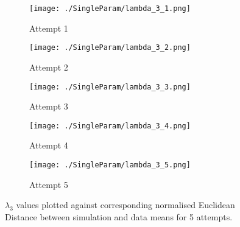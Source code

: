 \begin{figure}
    \begin{subfigure}{.5\textwidth}
      \centering
      \texttt{[image: ./SingleParam/lambda\_3\_1.png]}
      \caption{Attempt 1}
      \label{singlelam:1}
    \end{subfigure}
    \begin{subfigure}{.5\textwidth}
      \centering
      \texttt{[image: ./SingleParam/lambda\_3\_2.png]}
      \caption{Attempt 2}
      \label{singlelam:2}
    \end{subfigure}
    \begin{subfigure}{.5\textwidth}
        \centering
        \texttt{[image: ./SingleParam/lambda\_3\_3.png]}
        \caption{Attempt 3}
        \label{singlelam:3}
    \end{subfigure}
    \begin{subfigure}{.5\textwidth} 
        \centering
        \texttt{[image: ./SingleParam/lambda\_3\_4.png]}
        \caption{Attempt 4}
        \label{singlelam:4}
    \end{subfigure}
    \begin{subfigure}{.5\textwidth}
        \centering
        \texttt{[image: ./SingleParam/lambda\_3\_5.png]}
        \caption{Attempt 5}
        \label{singlelam:5}
    \end{subfigure}

    \caption{$\lambda_3$ values plotted against corresponding normalised Euclidean Distance between simulation and data means for 5 attempts.}
    \label{singlelam}
\end{figure}

